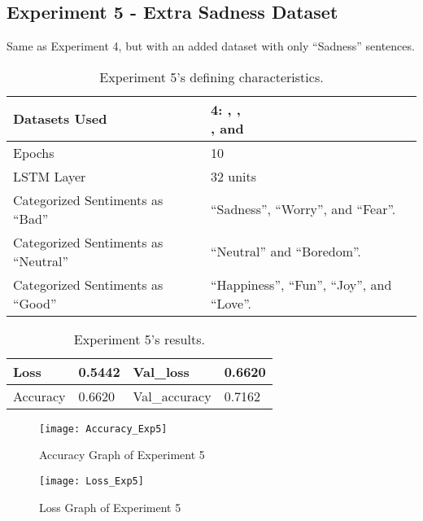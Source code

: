 \subsection{Experiment 5 - Extra Sadness Dataset}
\label{exp5}
Same as Experiment 4, but with an added dataset with only ``Sadness'' sentences.
\begin{table}[!h]
	\caption{Experiment 5's defining characteristics.}
	\vspace{0.5cm}
	\centering
	\begin{tabular}[t]{|l|l|}
	\hline
		Datasets Used & \makecell{4: \citet{d1}, \citet{d2},\\ \citet{d3}, and \citet{d4}}
	\\ \hline
		Epochs & 10
	\\ \hline
		LSTM Layer & 32 units
	\\ \hline
		Categorized Sentiments as ``Bad'' & ``Sadness'', ``Worry'', and ``Fear''.
	\\ \hline	
		 Categorized Sentiments as ``Neutral'' & ``Neutral'' and ``Boredom''.
	\\ \hline	
		Categorized Sentiments as ``Good'' & ``Happiness'', ``Fun'', ``Joy'', and ``Love''.
	\\ \hline
	\end{tabular}
\end{table}

\begin{table}[!b]
	\caption{Experiment 5's results.}
	\vspace{0.5cm}
	\centering
	\begin{tabular}[t]{|l|l|l|l|}
	\hline
		Loss & 0.5442 & Val\_loss & 0.6620
	\\ \hline
		Accuracy & 0.6620 & Val\_accuracy & 0.7162
	\\ \hline
	\end{tabular}
\end{table}


\begin{figure}[!h]
	\centering
	\texttt{[image: Accuracy\_Exp5]}
	\caption{Accuracy Graph of Experiment 5}
	\label{fig:accuracy_exp5}
	\texttt{[image: Loss\_Exp5]}
	\caption{Loss Graph of Experiment 5}
	\label{fig:loss_exp5}
\end{figure}
\pagebreak

